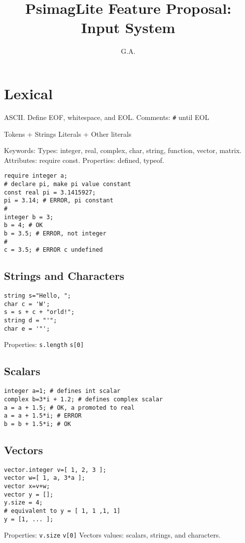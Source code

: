 \documentclass[twocolumn]{article}
\begin{document}
\title{PsimagLite Feature Proposal:
Input System}
\author{G.A.}
\maketitle

\section{Lexical}
ASCII.
Define EOF, whitespace, and EOL.
Comments: \verb!#! until EOL

Tokens + Strings Literals + Other literals

Keywords: Types: integer, real, complex, char, string, function, vector, matrix. 
Attributes: require const. Properties: defined, typeof.
\begin{verbatim}
require integer a;
# declare pi, make pi value constant
const real pi = 3.1415927;
pi = 3.14; # ERROR, pi constant
#
integer b = 3;
b = 4; # OK
b = 3.5; # ERROR, not integer
#
c = 3.5; # ERROR c undefined
\end{verbatim}

\subsection{Strings and Characters} 
\begin{verbatim}
string s="Hello, ";
char c = 'W';
s = s + c + "orld!";
string d = "'";
char e = '"';
\end{verbatim}
Properties: \verb!s.length! \verb!s[0]!

\subsection{Scalars} 
\begin{verbatim}
integer a=1; # defines int scalar
complex b=3*i + 1.2; # defines complex scalar
a = a + 1.5; # OK, a promoted to real
a = a + 1.5*i; # ERROR
b = b + 1.5*i; # OK
\end{verbatim}

\subsection{Vectors} 
\begin{verbatim}
vector.integer v=[ 1, 2, 3 ];
vector w=[ 1, a, 3*a ];
vector x=v+w;
vector y = [];
y.size = 4;
# equivalent to y = [ 1, 1 ,1, 1]
y = [1, ... ]; 
\end{verbatim}
Properties: \verb!v.size! \verb!v[0]!
Vectors values: scalars, strings, and characters.
\end{document}
